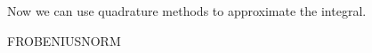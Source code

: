 \documentclass{sciposter}
\begin{document}
\begin{multicols}{2}
Now we can use quadrature methods to approximate the integral.




FROBENIUSNORM




\end{multicols}
\end{document}
